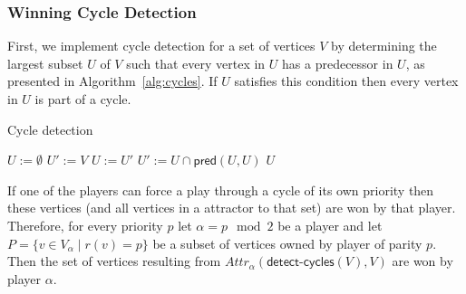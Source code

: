 \documentclass{article}
\newcommand{\attrsym}{\ensuremath{\textit{Attr}}}
\newcommand{\attr}[3][]{\ensuremath{\attrsym^{#1}_{#2}(#3)}}
\begin{document}
\subsubsection{Winning Cycle Detection}

First, we implement cycle detection for a set of vertices $V$ by determining the largest subset $U$ of $V$ such that every vertex in $U$ has a predecessor in $U$, as presented in Algorithm~\ref{alg:cycles}.
If $U$ satisfies this condition then every vertex in $U$ is part of a cycle.

\begin{algorithm}[h]
\caption{Cycle detection}
\label{alg:cycles}
\begin{algorithmic}[1]
\State $U := \emptyset$
\State $U' := V$
  \State $U := U'$
  \State $U' := U \cap \textsf{pred}(U, U)$
\EndWhile
\State \Return $U$
\EndFunction
\end{algorithmic}
\end{algorithm}

If one of the players can force a play through a cycle of its own priority then these vertices (and all vertices in a attractor to that set) are won by that player.
Therefore, for every priority $p$ let $\alpha = p \mod 2$ be a player and let $P = \{v \in V_\alpha \mid r(v) = p\}$ be a subset of vertices owned by player of parity $p$.
Then the set of vertices resulting from $\attr{\alpha}{\textsf{detect-cycles}(V), V}$ are won by player $\alpha$.



\end{document}
